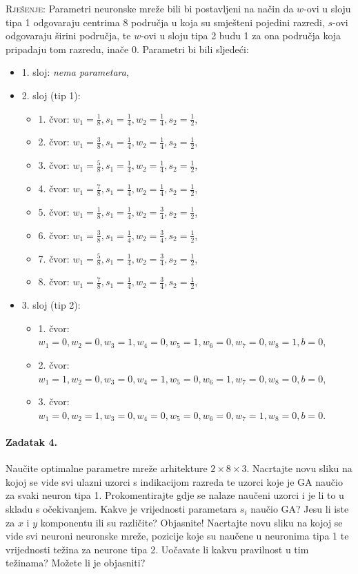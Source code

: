 \documentclass[12pt, a4paper]{article}
\begin{document}
\noindent\textsc{Rješenje:}
Parametri neuronske mreže bili bi postavljeni na način da $w$-ovi u sloju tipa 1 odgovaraju centrima 8 područja u koja su smješteni pojedini razredi, $s$-ovi odgovaraju širini područja, te $w$-ovi u sloju tipa 2 budu 1 za ona područja koja pripadaju tom razredu, inače 0. Parametri bi bili sljedeći:
\begin{itemize}
  \item 1. sloj: \textit{nema parametara},
  \item 2. sloj (tip 1):
  \begin{itemize}
    \item 1. čvor: $w_1=\frac{1}{8}, s_1=\frac{1}{4}, w_2=\frac{1}{4}, s_2=\frac{1}{2}$,
    \item 2. čvor: $w_1=\frac{3}{8}, s_1=\frac{1}{4}, w_2=\frac{1}{4}, s_2=\frac{1}{2}$,
    \item 3. čvor: $w_1=\frac{5}{8}, s_1=\frac{1}{4}, w_2=\frac{1}{4}, s_2=\frac{1}{2}$,
    \item 4. čvor: $w_1=\frac{7}{8}, s_1=\frac{1}{4}, w_2=\frac{1}{4}, s_2=\frac{1}{2}$,
    \item 5. čvor: $w_1=\frac{1}{8}, s_1=\frac{1}{4}, w_2=\frac{3}{4}, s_2=\frac{1}{2}$,
    \item 6. čvor: $w_1=\frac{3}{8}, s_1=\frac{1}{4}, w_2=\frac{3}{4}, s_2=\frac{1}{2}$,
    \item 7. čvor: $w_1=\frac{5}{8}, s_1=\frac{1}{4}, w_2=\frac{3}{4}, s_2=\frac{1}{2}$,
    \item 8. čvor: $w_1=\frac{7}{8}, s_1=\frac{1}{4}, w_2=\frac{3}{4}, s_2=\frac{1}{2}$,
  \end{itemize}
  \item 3. sloj (tip 2):
  \begin{itemize}
    \item 1. čvor: $w_1=0, w_2=0, w_3=1, w_4=0, w_5=1, w_6=0, w_7=0, w_8=1, b=0$,
    \item 2. čvor: $w_1=1, w_2=0, w_3=0, w_4=1, w_5=0, w_6=1, w_7=0, w_8=0, b=0$,
    \item 3. čvor: $w_1=0, w_2=1, w_3=0, w_4=0, w_5=0, w_6=0, w_7=1, w_8=0, b=0$.
  \end{itemize}
\end{itemize}

\paragraph{Zadatak 4.}
Naučite optimalne parametre mreže arhitekture $2\times8\times3$.
Nacrtajte novu sliku na kojoj se vide svi ulazni uzorci s indikacijom razreda te uzorci koje je GA naučio za svaki neuron tipa 1.
Prokomentirajte gdje se nalaze naučeni uzorci i je li to u skladu s očekivanjem.
Kakve je vrijednosti parametara $s_i$ naučio GA?
Jesu li iste za $x$ i $y$ komponentu ili su različite?
Objasnite!
Nacrtajte novu sliku na kojoj se vide svi neuroni neuronske mreže, pozicije koje su naučene u neuronima tipa 1 te vrijednosti težina za neurone tipa 2.
Uočavate li kakvu pravilnost u tim težinama?
Možete li je objasniti?\\
\end{document}
